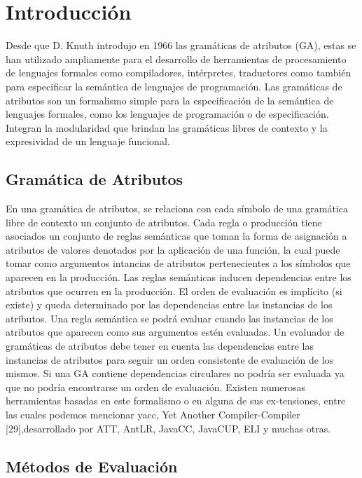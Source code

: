 \chapter{Introducci\'on}
\label{chap:intro}
\minitoc


Desde que D. Knuth introdujo en 1966 las gramáticas de atributos (GA), estas se han utilizado ampliamente para el desarrollo de herramientas de procesamiento de lenguajes formales como compiladores, intérpretes, traductores como también para especificar la semántica de lenguajes de programación. Las gramáticas de atributos son un formalismo simple para la especificación de la semántica de lenguajes formales, como los lenguajes de programación o de especificación. Integran la modularidad que brindan las gramáticas libres de contexto y la expresividad de un lenguaje funcional.

\section{Gramática de Atributos}

En una gramática de atributos, se relaciona con cada símbolo de una gramática libre de contexto un conjunto de atributos. Cada regla o producción tiene asociados un conjunto de reglas semánticas que toman la forma de asignación a atributos de valores denotados por la aplicación de una función, la cual puede tomar como argumentos intancias de atributos pertenecientes a los símbolos que aparecen en la producción.
Las reglas semánticas inducen dependencias entre los atributos que ocurren en la producción. El orden de evaluación es implícito (si existe) y queda determinado por las dependencias entre las instancias de los atributos.
Una regla semántica se podrá evaluar cuando las instancias de los atributos que aparecen como sus argumentos estén evaluadas. Un evaluador de gramáticas de atributos debe tener en cuenta las dependencias entre las instancias de atributos para seguir un orden consistente de evaluación de los mismos.
Si una GA contiene dependencias circulares no podría ser evaluada ya que no podría encontrarse un orden de evaluación. Existen numerosas herramientas basadas en este formalismo o en alguna de sus ex-tensiones, entre las cuales podemos mencionar yacc, Yet Another Compiler-Compiler [29],desarrollado por ATT, AntLR, JavaCC, JavaCUP, ELI y muchas otras.


\section{Métodos de Evaluación}

